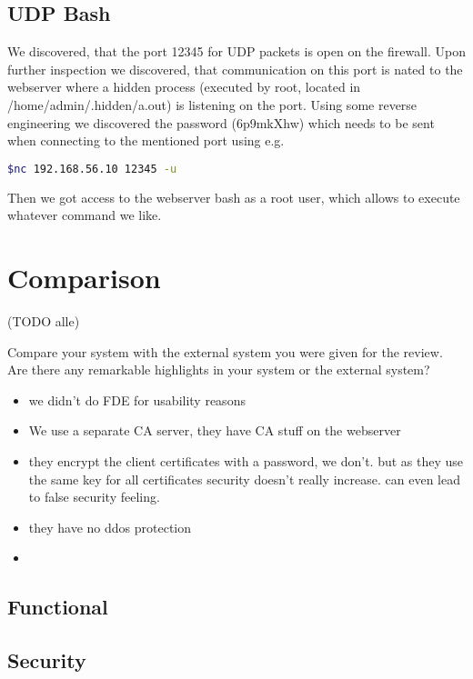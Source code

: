 \documentclass[english]{article}
\begin{document}
\subsection{UDP Bash}
We discovered, that the port 12345 for UDP packets is open on the firewall. Upon further inspection we discovered, that communication on this port is nated to the webserver where a hidden process (executed by root, located in /home/admin/.hidden/a.out) is listening on the port. Using some reverse engineering we discovered the password (6p9mkXhw) which needs to be sent when connecting to the mentioned port using e.g.
\begin{lstlisting}[language=bash]
$nc 192.168.56.10 12345 -u
\end{lstlisting}

Then we got access to the webserver bash as a root user, which allows to execute whatever command we like.

\section{Comparison} (TODO alle)

Compare your system with the external system you were given for the review. Are there any remarkable highlights in your system or the external system?

\begin{itemize}
	\item we didn't do FDE for usability reasons
	\item We use a separate CA server, they have CA stuff on the webserver
	\item they encrypt the client certificates with a password, we don't. but as they use the same key for all certificates security doesn't really increase. can even lead to false security feeling.
	\item they have no ddos protection
	\item 
\end{itemize}

\subsection{Functional}

\subsection{Security}
\end{document}
